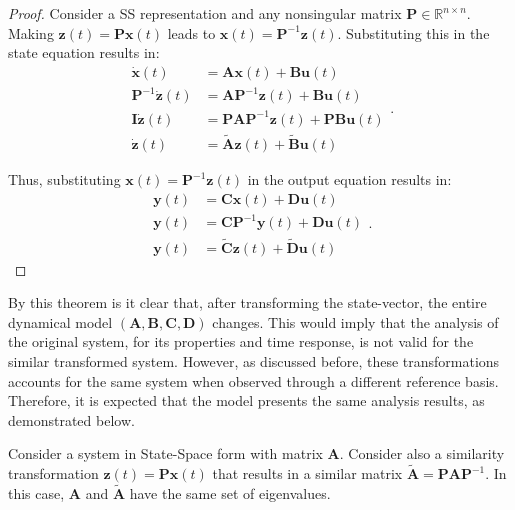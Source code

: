 \documentclass[a4paper,11pt]{book}
\numberwithin{figure}{chapter}
\numberwithin{equation}{chapter}
\numberwithin{table}{chapter}
\newtheorem{theorem}{Theorem}[chapter]
\theoremstyle{definition}
\newcounter{boxed-theorem}
\newenvironment{boxed-theorem}[1]
{\begin{shaded} \begin{theorem}{#1}}
{\end{theorem} \end{shaded}}
\newcounter{boxed-definition}
\begin{document}
\begin{proof}
    Consider a SS representation and any nonsingular matrix $\bm{P} \in \mathbb{R}^{n \times n}$. Making $\bm{z}(t) = \bm{P} \bm{x}(t)$ leads to $\bm{x}(t) = \bm{P}^{-1} \bm{z}(t)$. Substituting this in the state equation results in:
    \begin{equation}
    \begin{split}
        \dot{\bm{x}}(t) &= \bm{A} \bm{x}(t) + \bm{B} \bm{u}(t) \\
        \bm{P}^{-1} \dot{\bm{z}}(t) &= \bm{A} \bm{P}^{-1} \bm{z}(t) + \bm{B} \bm{u}(t) \\
        \bm{I} \dot{\bm{z}}(t) &= \bm{P} \bm{A} \bm{P}^{-1} \bm{z}(t) + \bm{P} \bm{B} \bm{u}(t) \\
        \dot{\bm{z}}(t) &= \tilde{\bm{A}} \bm{z}(t) + \tilde{\bm{B}} \bm{u}(t)
    \end{split}
    .\end{equation}
    
    Thus, substituting $\bm{x}(t) = \bm{P}^{-1} \bm{z}(t)$ in the output equation results in:
    \begin{equation}
    \begin{split}
        \bm{y}(t) &= \bm{C} \bm{x}(t) + \bm{D} \bm{u}(t) \\
        \bm{y}(t) &= \bm{C} \bm{P}^{-1} \bm{y}(t) + \bm{D} \bm{u}(t) \\
        \bm{y}(t) &= \tilde{\bm{C}} \bm{z}(t) + \tilde{\bm{D}} \bm{u}(t)
    \end{split}
    .\end{equation}
\end{proof}

By this theorem is it clear that, after transforming the state-vector, the entire dynamical model $(\bm{A}, \bm{B}, \bm{C}, \bm{D})$ changes. This would imply that the analysis of the original system, for its properties and time response, is not valid for the similar transformed system. However, as discussed before, these transformations accounts for the same system when observed through a different reference basis. Therefore, it is expected that the model presents the same analysis results, as demonstrated below.

\begin{boxed-theorem}{} \label{th:simTrans01}
    Consider a system in State-Space form with matrix $\bm{A}$. Consider also a similarity transformation $\bm{z}(t) = \bm{P} \bm{x}(t)$ that results in a similar matrix $\tilde{\bm{A}} = \bm{P} \bm{A} \bm{P}^{-1}$. In this case, $\bm{A}$ and $\tilde{\bm{A}}$ have the same set of eigenvalues.
\end{boxed-theorem}
\end{document}
